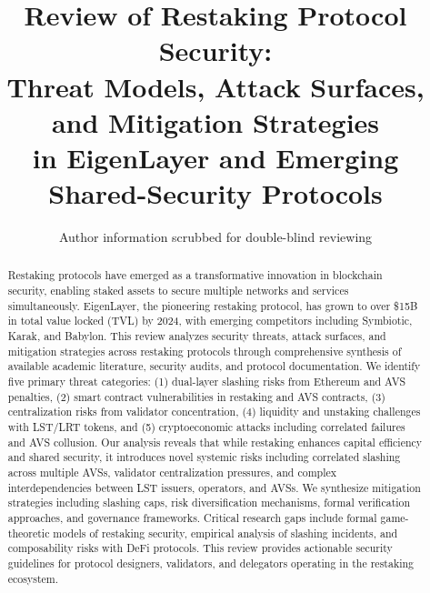\documentclass[runningheads]{llncs}
\begin{document}
\title{Review of Restaking Protocol Security:\\
Threat Models, Attack Surfaces, and Mitigation Strategies\\
in EigenLayer and Emerging Shared-Security Protocols}

\author{Author information scrubbed for double-blind reviewing}

\maketitle

\begin{abstract}
Restaking protocols have emerged as a transformative innovation in blockchain security, enabling staked assets to secure multiple networks and services simultaneously. EigenLayer, the pioneering restaking protocol, has grown to over \$15B in total value locked (TVL) by 2024, with emerging competitors including Symbiotic, Karak, and Babylon. This review analyzes security threats, attack surfaces, and mitigation strategies across restaking protocols through comprehensive synthesis of available academic literature, security audits, and protocol documentation. We identify five primary threat categories: (1) dual-layer slashing risks from Ethereum and AVS penalties, (2) smart contract vulnerabilities in restaking and AVS contracts, (3) centralization risks from validator concentration, (4) liquidity and unstaking challenges with LST/LRT tokens, and (5) cryptoeconomic attacks including correlated failures and AVS collusion. Our analysis reveals that while restaking enhances capital efficiency and shared security, it introduces novel systemic risks including correlated slashing across multiple AVSs, validator centralization pressures, and complex interdependencies between LST issuers, operators, and AVSs. We synthesize mitigation strategies including slashing caps, risk diversification mechanisms, formal verification approaches, and governance frameworks. Critical research gaps include formal game-theoretic models of restaking security, empirical analysis of slashing incidents, and composability risks with DeFi protocols. This review provides actionable security guidelines for protocol designers, validators, and delegators operating in the restaking ecosystem.
\end{abstract}


\vspace{-0.3cm}
\end{document}
